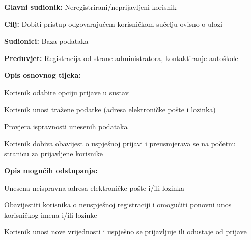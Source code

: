 \noindent {}
\begin{packed_item}
	
	\item \textbf{Glavni sudionik:} Neregistrirani/neprijavljeni korisnik
	\item  \textbf{Cilj:} Dobiti pristup odgovarajućem korisničkom sučelju ovisno o ulozi 
	\item  \textbf{Sudionici:} Baza podataka
	\item  \textbf{Preduvjet:} Registracija od strane administratora, kontaktiranje autoškole
	\item  \textbf{Opis osnovnog tijeka:}
	
	\item[] \begin{packed_enum}
		
		\item Korisnik odabire opciju prijave u sustav
		\item Korisnik unosi tražene podatke (adresa elektroničke pošte i lozinka)
		\item Provjera ispravnosti unesenih podataka 
		\item Korisnik dobiva obavijest o uspješnoj prijavi i preusmjerava se na početnu stranicu za prijavljene korisnike 
		
	\end{packed_enum}
	
	\item  \textbf{Opis mogućih odstupanja:}
	
	\item[] \begin{packed_item}
		
		\item[2.a] Unesena neispravna adresa elektroničke pošte i/ili lozinka  
		\item[] \begin{packed_enum}
			
			\item Obavijestiti korisnika o neuspješnoj registraciji i omogućiti ponovni unos korisničkog imena i/ili lozinke
			\item Korisnik unosi nove vrijednosti i uspješno se prijavljuje ili odustaje od prijave
			
		\end{packed_enum}
	\end{packed_item}
	
\end{packed_item}

